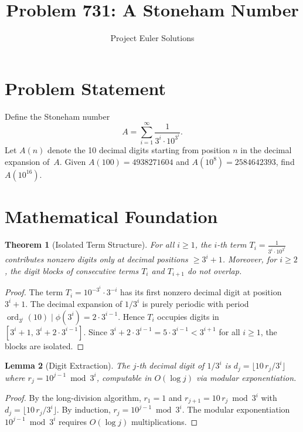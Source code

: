\documentclass[11pt]{article}
\title{Problem 731: A Stoneham Number}
\author{Project Euler Solutions}
\date{}
\newtheorem{theorem}{Theorem}
\newtheorem{lemma}[theorem]{Lemma}
\begin{document}
\maketitle

\section{Problem Statement}

Define the Stoneham number
\[
A = \sum_{i=1}^{\infty} \frac{1}{3^i \cdot 10^{3^i}}.
\]
Let $A(n)$ denote the 10 decimal digits starting from position $n$ in the decimal expansion of~$A$. Given $A(100) = 4938271604$ and $A(10^8) = 2584642393$, find $A(10^{16})$.

\section{Mathematical Foundation}

\begin{theorem}[Isolated Term Structure]
For all $i \ge 1$, the $i$-th term $T_i = \frac{1}{3^i \cdot 10^{3^i}}$ contributes nonzero digits only at decimal positions $\ge 3^i + 1$. Moreover, for $i \ge 2$, the digit blocks of consecutive terms $T_i$ and $T_{i+1}$ do not overlap.
\end{theorem}

\begin{proof}
The term $T_i = 10^{-3^i} \cdot 3^{-i}$ has its first nonzero decimal digit at position $3^i + 1$. The decimal expansion of $1/3^i$ is purely periodic with period $\operatorname{ord}_{3^i}(10) \mid \phi(3^i) = 2 \cdot 3^{i-1}$. Hence $T_i$ occupies digits in $[3^i+1,\, 3^i + 2 \cdot 3^{i-1}]$. Since $3^i + 2 \cdot 3^{i-1} = 5 \cdot 3^{i-1} < 3^{i+1}$ for all $i \ge 1$, the blocks are isolated.
\end{proof}

\begin{lemma}[Digit Extraction]
The $j$-th decimal digit of $1/3^i$ is $d_j = \lfloor 10\, r_j / 3^i \rfloor$ where $r_j = 10^{j-1} \bmod 3^i$, computable in $O(\log j)$ via modular exponentiation.
\end{lemma}

\begin{proof}
By the long-division algorithm, $r_1 = 1$ and $r_{j+1} = 10\,r_j \bmod 3^i$ with $d_j = \lfloor 10\,r_j / 3^i \rfloor$. By induction, $r_j = 10^{j-1} \bmod 3^i$. The modular exponentiation $10^{j-1} \bmod 3^i$ requires $O(\log j)$ multiplications.
\end{proof}
\end{document}
